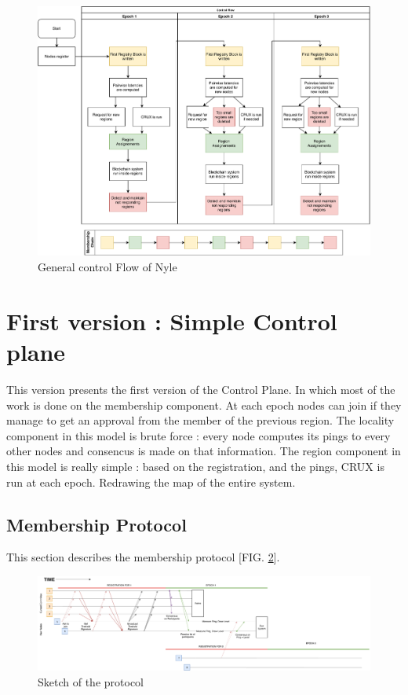 \documentclass[a4paper,11pt,oneside]{report}
\begin{document}
\begin{figure}[!h] \centering
\includegraphics[width=400pt]{figures/Nyle_controlflow} \caption{General control Flow
of Nyle} \label{fig:controlflow} \end{figure}

\section{First version : Simple Control plane} This version presents the first
version of the Control Plane. In which most of the work is done on the
membership component. At each epoch nodes can join if they manage to get an
approval from the member of the previous region. The locality component in this
model is brute force : every node computes its pings to every other nodes and
consencus is made on that information. The region component in this model is
really simple : based on the registration, and the pings, CRUX is run at each
epoch. Redrawing the map of the entire system. 


\subsection{Membership Protocol}
This section describes the membership protocol [FIG. \ref{fig:registrationprotocol}].


\begin{figure}[!h] 
\centering
\includegraphics[width=400pt]{figures/Registrationprotocol}
\caption{Sketch of the protocol}
\label{fig:registrationprotocol}
\end{figure}
\end{document}
